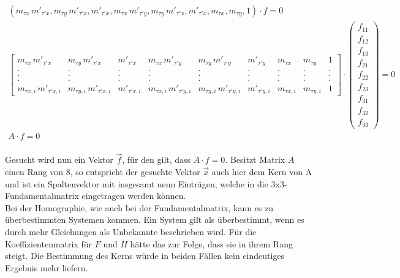 \begin{gather*}
	(m_{\tau x}\,m'_{\tau'x},m_{\tau y}\,m'_{\tau'x},m'_{\tau'x},m_{\tau x}\,m'_{\tau'y},m_{\tau y}\,m'_{\tau'x},m'_{\tau'x},m_{\tau x},m_{\tau y},1)\cdot f =0\\
	\begin{bmatrix}
		m_{\tau x}\,m'_{\tau'x}&m_{\tau y}\,m'_{\tau'x}&m'_{\tau'x}&m_{\tau x}\,m'_{\tau'y}&m_{\tau y}\,m'_{\tau'y}&m'_{\tau'y}&m_{\tau x}&m_{\tau y}&1\\
		.&.&.&.&.&.&.&.&.\\
		.&.&.&.&.&.&.&.&.\\
		.&.&.&.&.&.&.&.&.\\
		m_{\tau x,i}\,m'_{\tau'x,i}&m_{\tau y,i}\,m'_{\tau'x,i}&m'_{\tau'x,i}&m_{\tau x,i}\,m'_{\tau'y,i}&m_{\tau y,i}\,m'_{\tau'y,i}&m'_{\tau'y,i}&m_{\tau x,i}&m_{\tau y,i}&1
	\end{bmatrix}
	\cdot 
	\begin{pmatrix}
		f_{11}\\f_{12}\\f_{13}\\f_{21}\\f_{22}\\f_{23}\\f_{31}\\f_{32}\\f_{33}
	\end{pmatrix}
	= 0\\
	A\cdot f = 0
\end{gather*}\\


Gesucht wird nun ein Vektor $\vec{f}$, für den gilt, dass $A \cdot f = 0$. Besitzt Matrix $A$ einen Rang von 8, so entspricht der gesuchte Vektor $\vec{x}$ auch hier dem Kern von A und ist ein Spaltenvektor mit insgesamt neun Einträgen, welche in die 3x3-Fundamentalmatrix eingetragen werden können\cite{HZ,ZZGXr}.\\


Bei der Homographie, wie auch bei der Fundamentalmatrix, kann es zu überbestimmten Systemen kommen. Ein System gilt als überbestimmt, wenn es durch mehr Gleichungen als Unbekannte beschrieben wird\cite{Schwarz,Scholz}. Für die Koeffizientenmatrix für $F$ und $H$ hätte das zur Folge, dass sie in ihrem Rang steigt. Die Bestimmung des Kerns würde in beiden Fällen kein eindeutiges Ergebnis mehr liefern\cite{HZ,Schwarz}.\\


